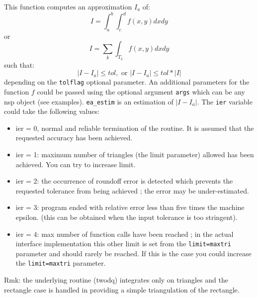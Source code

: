 \begin{mandescription}
This function computes an approximation $I_a$ of:
$$
   I = \int_a^b \int_c^d f(x,y) dxdy
$$
or
$$
   I = \sum_k \int_{T_k} f(x,y) dxdy
$$
such that:
$$
   | I - I_a | \le  tol, \mbox{ or } | I - I_a | \le  tol*|I|
$$
depending on the \verb+tolflag+ optional parameter.
An additional parameters for the function $f$ could be passed using the
optional argument \verb+args+ which can be any nsp object (see
examples). \verb+ea_estim+ is an estimation of $| I - I_a |$. The
\verb+ier+ variable could take the following values: 
\begin{itemize}
\item ier = 0,  normal and reliable termination of the routine. It is assumed that the
      requested  accuracy has been achieved.
\item ier = 1: maximum number of triangles (the limit
      parameter) allowed has been achieved. You can try to
      increase limit.
\item ier = 2: the occurrence of roundoff error is detected
      which prevents the requested tolerance from being
      achieved ; the error may be under-estimated.
\item ier = 3: program ended with relative error less than five times the machine epsilon.
      (this can be obtained when the input tolerance is too stringent).
\item ier = 4: max number of function calls have been reached ;
      in the actual interface implementation this other limit is set
      from the \verb+limit=maxtri+ parameter and should rarely be
      reached. If this is the case you could increase the
      \verb+limit=maxtri+ parameter.
\end{itemize}

Rmk: the underlying routine (twodq) integrates only on triangles and
the rectangle case is handled in providing a simple triangulation of
the rectangle. 
\end{mandescription}

